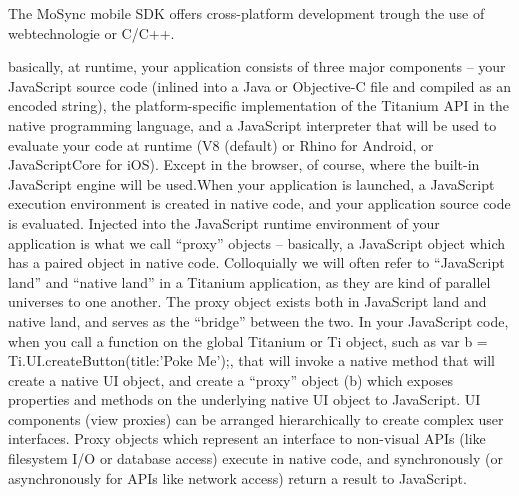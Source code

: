 The MoSync mobile SDK offers cross-platform development trough the use of webtechnologie or C/C++.





basically, at runtime, your application consists of three major components – your JavaScript source code (inlined into a Java or Objective-C file and compiled as an encoded string), the platform-specific implementation of the Titanium API in the native programming language, and a JavaScript interpreter that will be used to evaluate your code at runtime (V8 (default) or Rhino for Android, or JavaScriptCore for iOS). Except in the browser, of course, where the built-in JavaScript engine will be used.When your application is launched, a JavaScript execution environment is created in native code, and your application source code is evaluated. Injected into the JavaScript runtime environment of your application is what we call “proxy” objects – basically, a JavaScript object which has a paired object in native code. Colloquially we will often refer to “JavaScript land” and “native land” in a Titanium application, as they are kind of parallel universes to one another. The proxy object exists both in JavaScript land and native land, and serves as the “bridge” between the two.
In your JavaScript code, when you call a function on the global Titanium or Ti object, such as var b = Ti.UI.createButton({title:'Poke Me'});, that will invoke a native method that will create a native UI object, and create a “proxy” object (b) which exposes properties and methods on the underlying native UI object to JavaScript.
UI components (view proxies) can be arranged hierarchically to create complex user interfaces. Proxy objects which represent an interface to non-visual APIs (like filesystem I/O or database access) execute in native code, and synchronously (or asynchronously for APIs like network access) return a result to JavaScript. \cite{Whinnery2012}












